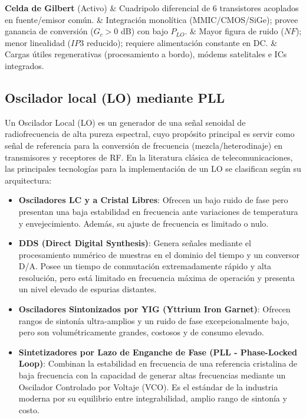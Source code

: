 \documentclass[11pt,a4paper,twoside]{report}
\begin{document}
\begin{table}
\begin{tabularx}{\textwidth}
			\hline
			\textbf{Celda de Gilbert} \newline (Activo) & Cuadripolo diferencial de 6 transistores acoplados en fuente/emisor común. & Integración monolítica (MMIC/CMOS/SiGe); provee ganancia de conversión ($G_c > 0$ dB) con bajo $P_{LO}$. & Mayor figura de ruido ($NF$); menor linealidad ($IP3$ reducido); requiere alimentación constante en DC. & Cargas útiles regenerativas (procesamiento a bordo), módems satelitales e ICs integrados. \\
			\hline
		\end{tabularx}
		
		\vspace{6pt}
		\caption{Cuadro Comparativo de Topologías de Mezcladores (Fuente: Maral, G., Bousquet, M., Z. Satellite Communications Systems)}
		\label{tab:topologias_mezcladores}
	\end{table}
	
	\subsection{Oscilador local (LO) mediante PLL}
	Un Oscilador Local (LO) es un generador de una señal senoidal de radiofrecuencia de alta pureza espectral, cuyo propósito principal es servir como señal de referencia para la conversión de frecuencia (mezcla/heterodinaje) en transmisores y receptores de RF. En la literatura clásica de telecomunicaciones, las principales tecnologías para la implementación de un LO se clasifican según su arquitectura:
	\begin{itemize}
		\item \textbf{Osciladores LC y a Cristal Libres}: Ofrecen un bajo ruido de fase pero presentan una baja estabilidad en frecuencia ante variaciones de temperatura y envejecimiento. Además, su ajuste de frecuencia es limitado o nulo.
		
		\item \textbf{DDS (Direct Digital Synthesis)}: Genera señales mediante el procesamiento numérico de muestras en el dominio del tiempo y un conversor D/A. Posee un tiempo de conmutación extremadamente rápido y alta resolución, pero está limitado en frecuencia máxima de operación y presenta un nivel elevado de espurias distantes.
		
		\item \textbf{Osciladores Sintonizados por YIG (Yttrium Iron Garnet)}: Ofrecen rangos de sintonía ultra-amplios y un ruido de fase excepcionalmente bajo, pero son volumétricamente grandes, costosos y de consumo elevado.
		
		\item \textbf{Sintetizadores por Lazo de Enganche de Fase (PLL - Phase-Locked Loop)}: Combinan la estabilidad en frecuencia de una referencia cristalina de baja frecuencia con la capacidad de generar altas frecuencias mediante un Oscilador Controlado por Voltaje (VCO). Es el estándar de la industria moderna por su equilibrio entre integrabilidad, amplio rango de sintonía y costo.
	\end{itemize}
	
\end{document}
